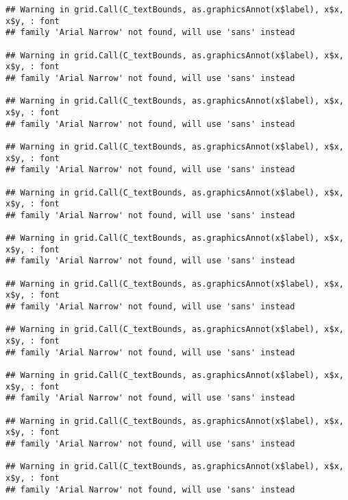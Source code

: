 \documentclass[
]{article}
\begin{document}
\begin{verbatim}
## Warning in grid.Call(C_textBounds, as.graphicsAnnot(x$label), x$x, x$y, : font
## family 'Arial Narrow' not found, will use 'sans' instead

## Warning in grid.Call(C_textBounds, as.graphicsAnnot(x$label), x$x, x$y, : font
## family 'Arial Narrow' not found, will use 'sans' instead

## Warning in grid.Call(C_textBounds, as.graphicsAnnot(x$label), x$x, x$y, : font
## family 'Arial Narrow' not found, will use 'sans' instead

## Warning in grid.Call(C_textBounds, as.graphicsAnnot(x$label), x$x, x$y, : font
## family 'Arial Narrow' not found, will use 'sans' instead

## Warning in grid.Call(C_textBounds, as.graphicsAnnot(x$label), x$x, x$y, : font
## family 'Arial Narrow' not found, will use 'sans' instead

## Warning in grid.Call(C_textBounds, as.graphicsAnnot(x$label), x$x, x$y, : font
## family 'Arial Narrow' not found, will use 'sans' instead

## Warning in grid.Call(C_textBounds, as.graphicsAnnot(x$label), x$x, x$y, : font
## family 'Arial Narrow' not found, will use 'sans' instead

## Warning in grid.Call(C_textBounds, as.graphicsAnnot(x$label), x$x, x$y, : font
## family 'Arial Narrow' not found, will use 'sans' instead

## Warning in grid.Call(C_textBounds, as.graphicsAnnot(x$label), x$x, x$y, : font
## family 'Arial Narrow' not found, will use 'sans' instead

## Warning in grid.Call(C_textBounds, as.graphicsAnnot(x$label), x$x, x$y, : font
## family 'Arial Narrow' not found, will use 'sans' instead

## Warning in grid.Call(C_textBounds, as.graphicsAnnot(x$label), x$x, x$y, : font
## family 'Arial Narrow' not found, will use 'sans' instead
\end{verbatim}
\end{document}
